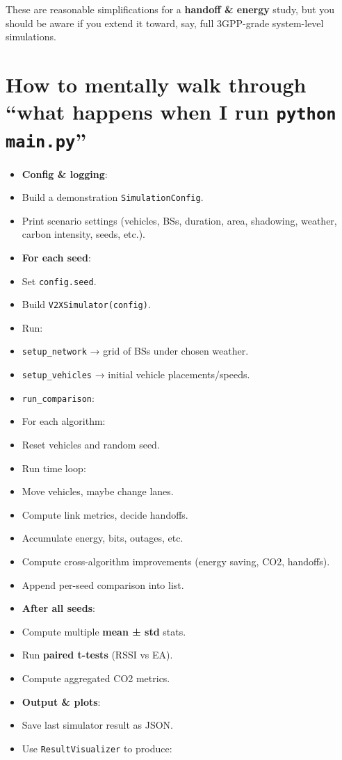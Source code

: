 \documentclass[conference]{IEEEtran}
\begin{document}
These are reasonable simplifications for a \textbf{handoff \& energy} study, but you should be aware if you extend it toward, say, full 3GPP-grade system-level simulations.



\section{How to mentally walk through “what happens when I run \texttt{python main.py}”}
\begin{itemize}
\item \textbf{Config \& logging}:
\item Build a demonstration \texttt{SimulationConfig}.
\item Print scenario settings (vehicles, BSs, duration, area, shadowing, weather, carbon intensity, seeds, etc.).
\item \textbf{For each seed}:
\item Set \texttt{config.seed}.
\item Build \texttt{V2XSimulator(config)}.
\item Run:
\item \texttt{setup\_network} → grid of BSs under chosen weather.
\item \texttt{setup\_vehicles} → initial vehicle placements/speeds.
\item \texttt{run\_comparison}:
\item For each algorithm:
\item Reset vehicles and random seed.
\item Run time loop:
\item Move vehicles, maybe change lanes.
\item Compute link metrics, decide handoffs.
\item Accumulate energy, bits, outages, etc.
\item Compute cross-algorithm improvements (energy saving, CO2, handoffs).
\item Append per-seed comparison into list.
\item \textbf{After all seeds}:
\item Compute multiple \textbf{mean ± std} stats.
\item Run \textbf{paired t-tests} (RSSI vs EA).
\item Compute aggregated CO2 metrics.
\item \textbf{Output \& plots}:
\item Save last simulator result as JSON.
\item Use \texttt{ResultVisualizer} to produce:

\end{itemize}
\end{document}
